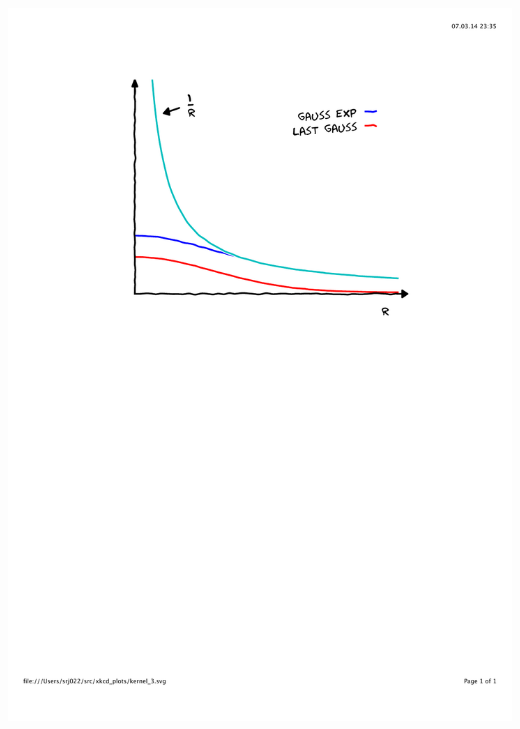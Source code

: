 \begin{frame}
\begin{columns}
\begin{column}{.45\textwidth}
{        \includegraphics[scale=0.4, clip, viewport = 110 450 490 800] {figures/kernel_3.pdf}}
\end{column}
\end{columns}
\end{frame}
